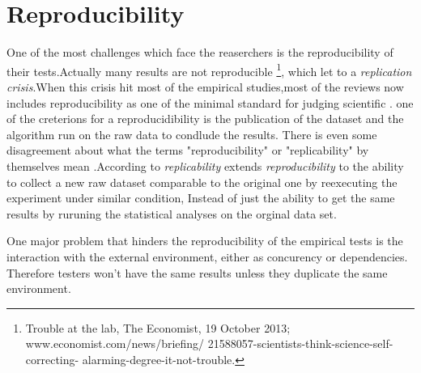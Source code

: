 \section{Reproducibility}




One of the most challenges which face the reaserchers is the reproducibility of their tests.Actually many results are not reproducible \footnote{Trouble at the lab, The Economist, 19 October 2013;  www.economist.com/news/briefing/ 21588057-scientists-think-science-self-correcting- alarming-degree-it-not-trouble.}, which let to a \emph{replication crisis}.When this crisis hit most of the empirical studies,most of the reviews now includes reproducibility as one of the minimal standard for judging scientific \cite{peng2011reproducible}. one of the creterions for a reproducidibility is the publication of the dataset and the algorithm run on the raw data to condlude the results. There is even some disagreement about what the terms "reproducibility" or "replicability" by themselves mean \cite{goodman2016does} .According to \cite{echtler2018open} \emph{replicability} extends \emph{reproducibility} to the ability to collect a new raw dataset comparable to the original one by reexecuting the experiment under similar condition, Instead of just the ability to get the same results by ruruning the statistical analyses on the orginal data set.

One major problem that hinders the reproducibility of the empirical tests is the interaction with the external environment, either as concurency or dependencies. Therefore testers won't have the same results unless they duplicate the same environment.
